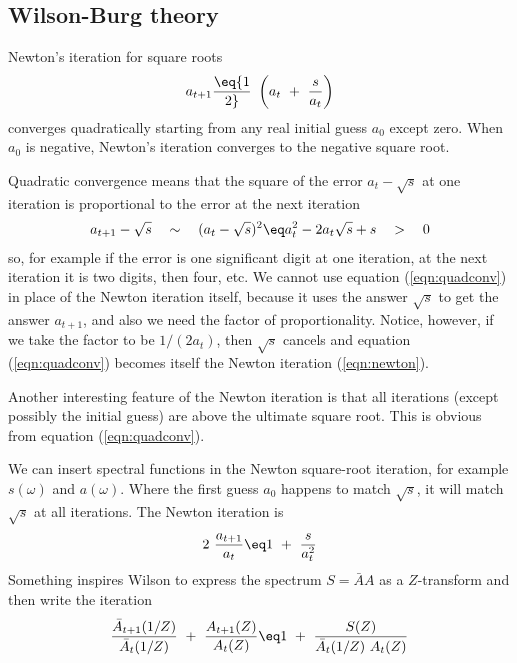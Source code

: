 \subsection{Wilson-Burg theory}
Newton's iteration for square roots
\begin{equation}
a_{t+1} \eq {1\over 2} \ \left( a_t \ +\ {s\over a_t} \right)
\label{eqn:newton}
\end{equation}
converges quadratically starting from any real initial guess $a_0$ except zero.
When $a_0$ is negative,
Newton's iteration converges to the negative square root.
\par
Quadratic convergence means that the square of the error
$a_t-\sqrt{s}$
at one iteration is proportional to the error at the next iteration
\begin{eqnarray}
\label{eqn:quadconv}
a_{t+1} - \sqrt{s} \quad\sim\quad ( a_t-\sqrt{s})^2 
\eq  a_t^2 - 2 a_t \sqrt{s} + s \quad > \quad 0
\end{eqnarray}
so, for example if the error is one significant digit at one iteration,
at the next iteration it is two digits, then four, etc.
We cannot use equation (\ref{eqn:quadconv}) in place of the Newton iteration itself,
because it uses the answer $\sqrt{s}$ to get the answer $a_{t+1}$,
and also we need the factor of proportionality.  Notice, however,
if we take the factor to be $1/(2a_t)$,
then $\sqrt{s}$ cancels and
equation (\ref{eqn:quadconv}) becomes itself the Newton iteration (\ref{eqn:newton}).
\par
Another interesting feature of the Newton iteration is that
all iterations (except possibly the initial guess)
are above the ultimate square root.
This is obvious from equation (\ref{eqn:quadconv}).
\par
We can insert spectral functions in the Newton square-root iteration,
for example $s(\omega)$ and $a(\omega)$.
Where the first guess $a_0$ happens to match $\sqrt{s}$,
it will match $\sqrt{s}$ at all iterations.
The Newton iteration is
\begin{equation}
2\ {a_{t+1}\over a_t} \eq   1 \ +\ {s\over a_t^2}
\end{equation}
Something inspires Wilson to
express the spectrum $S=\bar A A$ as a $Z$-transform
and then write the iteration
\begin{equation}
 {\bar A_{t+1}(1/Z) \over \bar A_t(1/Z)}
 \ +\ 
 {A_{t+1}(Z) \over A_t(Z)}
\eq
1 \ +\ {S(Z) \over \bar A_t(1/Z)\  A_t(Z)}
\label{eqn:wilson}
\end{equation}
\par

